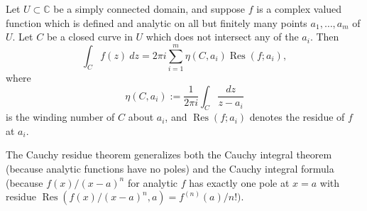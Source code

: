 \documentclass[12pt]{article}
\begin{document}
Let $U \subset \mathbb{C}$ be a simply connected domain, and suppose $f$ is a complex valued function which is defined and analytic on all but finitely many points $a_1, \dots, a_m$ of $U$. Let $C$ be a closed curve in $U$ which does not intersect any of the $a_i$. Then
$$
\int_C f(z)\ dz = 2 \pi i \sum_{i=1}^m \eta(C,a_i) \operatorname{Res}(f;a_i),
$$
where
$$
\eta(C,a_i) := \frac{1}{2 \pi i} \int_C \frac{dz}{z-a_i}
$$
is the winding number of $C$ about $a_i$, and $\operatorname{Res}(f;a_i)$ denotes the residue of $f$ at $a_i$.

The Cauchy residue theorem generalizes both the Cauchy integral theorem (because analytic functions have no poles) and the Cauchy integral formula (because $f(x)/(x-a)^n$ for analytic $f$ has exactly one pole at $x=a$ with residue $\operatorname{Res}(f(x)/(x-a)^n,a) = f^{(n)}(a)/n!)$.
\end{document}
